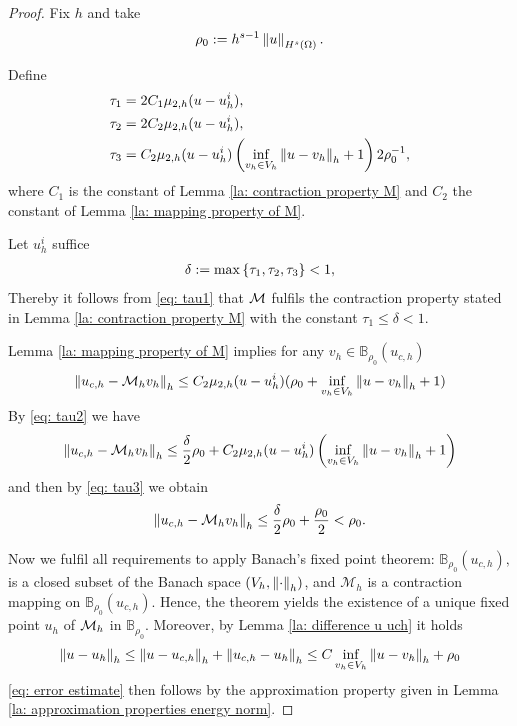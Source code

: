 \begin{proof}
	Fix $h$ and take
	\begin{align}
		\rho_0:= h^{s-1} \left\lVert u \right\rVert_{H^{s}(\Omega)}. \label{eq: definition rho0}
	\end{align}
	
	Define 
	\begin{align}
		\tau_1 &= 2 C_1 \mu_{2,h}(u-u_h^i), \label{eq: tau1}\\
		\tau_2 & = 2 C_2 \mu_{2,h}(u-u_h^i), \label{eq: tau2}\\
		\tau_3 & = C_2 \mu_{2,h}(u-u_h^i) \left(\inf_{v_h \in V_h} \left\lVert u-v_h \right\rVert_{h}+1\right) 2 \rho_0^{-1} \label{eq: tau3},
	\end{align}
	where $C_1$ is the constant of Lemma \ref{la: contraction property M} and $C_2$ the constant of Lemma \ref{la: mapping property of M}. 
	
	Let $u_h^i$ suffice
	\begin{align}
		\delta := \operatorname{max} \left\{ \tau_1, \tau_2, \tau_3 \right\} < 1,
	\end{align}
	Thereby it follows from \eqref{eq: tau1} that $\mathcal M$ fulfils the contraction property stated in Lemma \ref{la: contraction property M} with the constant $\tau_1\leq \delta<1$.
	
	Lemma \ref{la: mapping property of M} implies for any $v_h \in \mathbb{B}_{\rho_0}(u_{c,h})$
	 \[
	 	\left\lVert u_{c,h} - \mathcal M_h v_h \right\rVert_{h} \leq 
	 		C_2 \mu_{2,h}(u - u^i_h) (\rho_0+ \inf_{v_h \in V_h} \left\lVert u-v_h \right\rVert_{h}+1) 
	 \]
	By \eqref{eq: tau2} we have 
	 \[
	 	\left\lVert u_{c,h} - \mathcal M_h v_h \right\rVert_{h} \leq 
	 		\frac \delta 2 \rho_0 
	 			+ C_2  \mu_{2,h}(u - u^i_h) \left( \inf_{v_h \in V_h} \left\lVert u-v_h \right\rVert_{h}+1\right)
	 \]
	 and then by \eqref{eq: tau3} we obtain
	 \begin{align}
	 	\left\lVert u_{c,h} - \mathcal M_h v_h \right\rVert_{h} \leq 
	 		\frac \delta 2 \rho_0 
	 		+ \frac {\rho_0} 2  < \rho_0. \label{eq: self mapping M}
	 \end{align} 
	 
	 Now we fulfil all requirements to apply Banach's fixed point theorem: $\mathbb{B}_{\rho_0}(u_{c,h}), $ is a closed subset of the Banach space $(V_h, \left\lVert \cdot \right\rVert_{h})$, and $\mathcal M_h$ is a contraction mapping on $ \mathbb{B}_{\rho_0}(u_{c,h})$. Hence, the theorem yields the existence of a unique fixed point $u_h$ of $\mathcal M_h$ in $\mathbb B_{\rho_0}$.
	 Moreover, by Lemma \ref{la: difference u uch} it holds
	 \begin{align}
	 	\left\lVert u-u_h \right\rVert_{h} \leq \left\lVert u-u_{c,h} \right\rVert_{h} + \left\lVert u_{c,h} - u_h \right\rVert_{h} \leq C \inf_{v_h \in V_h} \left\lVert u-v_h \right\rVert_{h} +\rho_0 
	\end{align}
	\eqref{eq: error estimate} then follows by the approximation property given in Lemma \ref{la: approximation properties energy norm}.
	

\end{proof}
